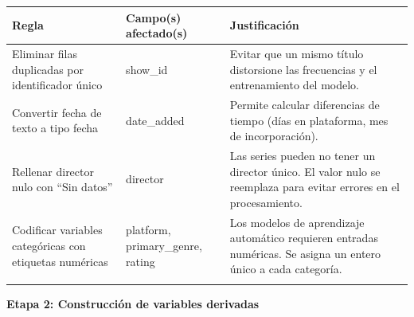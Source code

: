 \documentclass[12pt,a4paper]{article}
\begin{document}
\vspace{0.2cm}
\begin{center}
\begin{tabular}{p{4.5cm} p{4.5cm} p{5cm}}
\toprule
Regla & Campo(s) afectado(s) & Justificaci\'on \\
\midrule
\addlinespace[0.15cm]
Eliminar filas duplicadas por identificador \'unico &
show\_id &
Evitar que un mismo t\'itulo distorsione las frecuencias y el entrenamiento del modelo. \\
\addlinespace[0.3cm]
Convertir fecha de texto a tipo fecha &
date\_added &
Permite calcular diferencias de tiempo (d\'ias en plataforma, mes de incorporaci\'on). \\
\addlinespace[0.3cm]
Rellenar director nulo con ``Sin datos'' &
director &
Las series pueden no tener un director \'unico. El valor nulo se reemplaza para evitar errores en el procesamiento. \\
\addlinespace[0.3cm]
Codificar variables categ\'oricas con etiquetas num\'ericas &
platform, primary\_genre, rating &
Los modelos de aprendizaje autom\'atico requieren entradas num\'ericas. Se asigna un entero \'unico a cada categor\'ia. \\
\addlinespace[0.15cm]
\bottomrule
\end{tabular}
\end{center}

\vspace{0.5cm}

\textbf{Etapa 2: Construcci\'on de variables derivadas}
\end{document}
